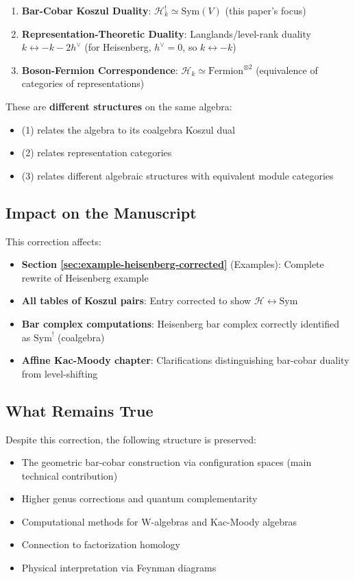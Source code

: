 \begin{enumerate}
\item \textbf{Bar-Cobar Koszul Duality}: $\mathcal{H}_k^! \simeq \text{Sym}(V)$ (this paper's focus)
\item \textbf{Representation-Theoretic Duality}: Langlands/level-rank duality $k \leftrightarrow -k-2h^\vee$ (for Heisenberg, $h^\vee = 0$, so $k \leftrightarrow -k$)
\item \textbf{Boson-Fermion Correspondence}: $\mathcal{H}_k \simeq \text{Fermion}^{\otimes 2}$ (equivalence of categories of representations)
\end{enumerate}

These are \textbf{different structures} on the same algebra:
\begin{itemize}
\item (1) relates the algebra to its coalgebra Koszul dual
\item (2) relates representation categories
\item (3) relates different algebraic structures with equivalent module categories
\end{itemize}

\subsection{Impact on the Manuscript}

This correction affects:
\begin{itemize}
\item \textbf{Section \ref{sec:example-heisenberg-corrected}} (Examples): Complete rewrite of Heisenberg example
\item \textbf{All tables of Koszul pairs}: Entry corrected to show $\mathcal{H} \leftrightarrow \text{Sym}$
\item \textbf{Bar complex computations}: Heisenberg bar complex correctly identified as $\text{Sym}^!$ (coalgebra)
\item \textbf{Affine Kac-Moody chapter}: Clarifications distinguishing bar-cobar duality from level-shifting
\end{itemize}

\subsection{What Remains True}

Despite this correction, the following structure is preserved:
\begin{itemize}
\item The geometric bar-cobar construction via configuration spaces (main technical contribution)
\item Higher genus corrections and quantum complementarity
\item Computational methods for W-algebras and Kac-Moody algebras
\item Connection to factorization homology
\item Physical interpretation via Feynman diagrams
\end{itemize}

